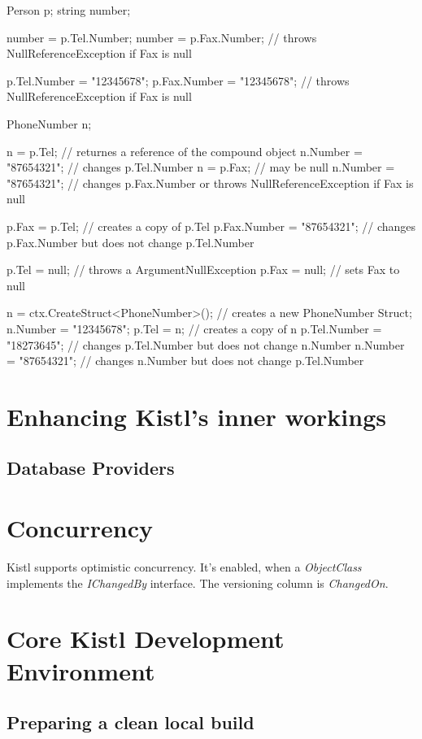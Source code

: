 \begin{CS}
Person p;
string number;

number = p.Tel.Number;
number = p.Fax.Number; // throws NullReferenceException if Fax is null

p.Tel.Number = "12345678";
p.Fax.Number = "12345678"; // throws NullReferenceException if Fax is null

PhoneNumber n;

n = p.Tel; // returnes a reference of the compound object
n.Number = "87654321"; // changes p.Tel.Number
n = p.Fax; // may be null
n.Number = "87654321"; // changes p.Fax.Number or throws NullReferenceException if Fax is null

p.Fax = p.Tel; // creates a copy of p.Tel
p.Fax.Number = "87654321"; // changes p.Fax.Number but does not change p.Tel.Number

p.Tel = null; // throws a ArgumentNullException
p.Fax = null; // sets Fax to null

n = ctx.CreateStruct<PhoneNumber>(); // creates a new PhoneNumber Struct;
n.Number = "12345678";
p.Tel = n; // creates a copy of n
p.Tel.Number = "18273645"; // changes p.Tel.Number but does not change n.Number
n.Number = "87654321"; // changes n.Number but does not change p.Tel.Number
\end{CS}

\section{Enhancing Kistl's inner workings}

\subsection{Database Providers}




\section{Concurrency}
Kistl supports optimistic concurrency. It's enabled, when a \emph{ObjectClass}
implements the \emph{IChangedBy} interface. The versioning column is
\emph{ChangedOn}.

\section{Core Kistl Development Environment}

\subsection{Preparing a clean local build}

